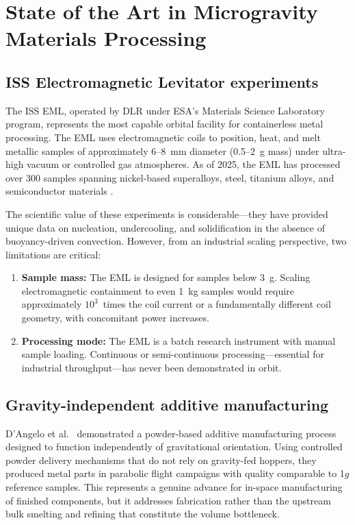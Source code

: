 \documentclass[preprint,12pt]{elsarticle}
\begin{document}
\section{State of the Art in Microgravity Materials Processing}
\label{sec:state-of-art}

\subsection{ISS Electromagnetic Levitator experiments}

The ISS EML, operated by DLR under ESA's Materials Science Laboratory program, represents the most capable orbital facility for containerless metal processing. The EML uses electromagnetic coils to position, heat, and melt metallic samples of approximately 6--8~mm diameter (0.5--2~g mass) under ultra-high vacuum or controlled gas atmospheres. As of 2025, the EML has processed over 300 samples spanning nickel-based superalloys, steel, titanium alloys, and semiconductor materials \cite{ratke1995}.

The scientific value of these experiments is considerable---they have provided unique data on nucleation, undercooling, and solidification in the absence of buoyancy-driven convection. However, from an industrial scaling perspective, two limitations are critical:

\begin{enumerate}
    \item \textbf{Sample mass:} The EML is designed for samples below 3~g. Scaling electromagnetic containment to even 1~kg samples would require approximately $10^3$~times the coil current or a fundamentally different coil geometry, with concomitant power increases.
    \item \textbf{Processing mode:} The EML is a batch research instrument with manual sample loading. Continuous or semi-continuous processing---essential for industrial throughput---has never been demonstrated in orbit.
\end{enumerate}

\subsection{Gravity-independent additive manufacturing}

D'Angelo et al.\ \cite{dangelo2021} demonstrated a powder-based additive manufacturing process designed to function independently of gravitational orientation. Using controlled powder delivery mechanisms that do not rely on gravity-fed hoppers, they produced metal parts in parabolic flight campaigns with quality comparable to 1$g$ reference samples. This represents a genuine advance for in-space manufacturing of finished components, but it addresses fabrication rather than the upstream bulk smelting and refining that constitute the volume bottleneck.
\end{document}
